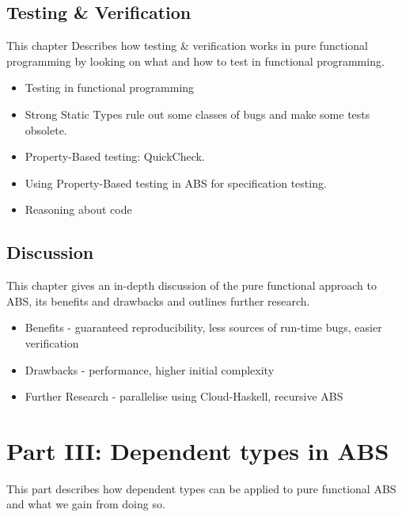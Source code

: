 \subsection{Testing \& Verification}
This chapter Describes how testing \& verification works in pure functional programming by looking on what and how to test in functional programming.
\begin{itemize}
	\item Testing in functional programming
	\item Strong Static Types rule out some classes of bugs and make some tests obsolete.
	\item Property-Based testing: QuickCheck.
	\item Using Property-Based testing in ABS for specification testing.
	\item Reasoning about code
\end{itemize}


\subsection{Discussion}
This chapter gives an in-depth discussion of the pure functional approach to ABS, its benefits and drawbacks and outlines further research.
\begin{itemize}
	\item Benefits - guaranteed reproducibility, less sources of run-time bugs, easier verification
	\item Drawbacks - performance, higher initial complexity
	\item Further Research - parallelise using Cloud-Haskell, recursive ABS
\end{itemize}

\section{Part III: Dependent types in ABS}
This part describes how dependent types can be applied to pure functional ABS and what we gain from doing so.

